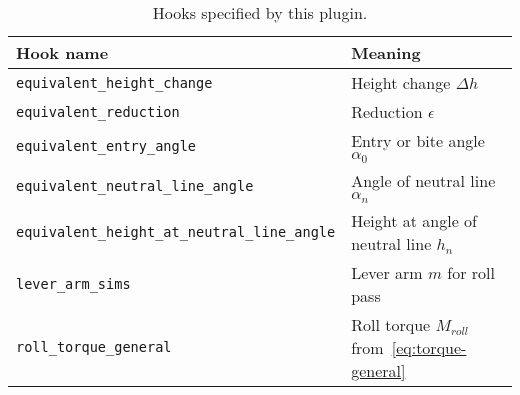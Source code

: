 \documentclass[11pt]{PyRollDocs}
\begin{document}
    \begin{table}
        \centering
        \caption{Hooks specified by this plugin.}
        \label{tab:hookspecs}
        \begin{tabular}{ll}
            \toprule
            Hook name                                             & Meaning                                               \\
            \midrule
            \texttt{equivalent\_height\_change}                   & Height change $\Delta h$                              \\
            \texttt{equivalent\_reduction}                        & Reduction $\epsilon$                                  \\
            \texttt{equivalent\_entry\_angle}                     & Entry or bite angle  $\alpha_0$                         \\
            \texttt{equivalent\_neutral\_line\_angle}             & Angle of neutral line $\alpha_n$                      \\
            \texttt{equivalent\_height\_at\_neutral\_line\_angle} & Height at angle of neutral line $h_n$                 \\
            \texttt{lever\_arm\_sims}                             & Lever arm $m$ for roll pass                           \\
            \texttt{roll\_torque\_general}                        & Roll torque $M_{roll}$ from~\eqref{eq:torque-general} \\
            \bottomrule
        \end{tabular}
    \end{table}

    \printbibliography
\end{document}
